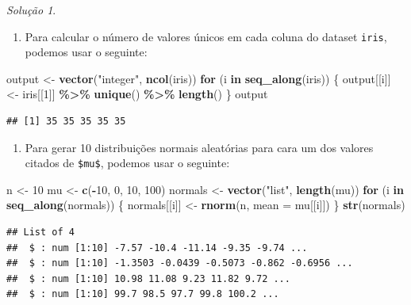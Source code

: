 \documentclass[
]{latex/krantz}
\newenvironment{Shaded}{\begin{snugshade}}{\end{snugshade}}
\newcommand{\AttributeTok}[1]{\textcolor[rgb]{0.13,0.29,0.53}{#1}}
\newcommand{\ControlFlowTok}[1]{\textcolor[rgb]{0.13,0.29,0.53}{\textbf{#1}}}
\newcommand{\DecValTok}[1]{\textcolor[rgb]{0.00,0.00,0.81}{#1}}
\newcommand{\FunctionTok}[1]{\textcolor[rgb]{0.13,0.29,0.53}{\textbf{#1}}}
\newcommand{\NormalTok}[1]{#1}
\newcommand{\OtherTok}[1]{\textcolor[rgb]{0.56,0.35,0.01}{#1}}
\newcommand{\SpecialCharTok}[1]{\textcolor[rgb]{0.81,0.36,0.00}{\textbf{#1}}}
\newcommand{\StringTok}[1]{\textcolor[rgb]{0.31,0.60,0.02}{#1}}
\providecommand{\tightlist}{%
  \setlength{\itemsep}{0pt}\setlength{\parskip}{0pt}}
\theoremstyle{definition}
\theoremstyle{definition}
\theoremstyle{definition}
\theoremstyle{definition}
\theoremstyle{remark}
\newtheorem*{solution}{Solução}
\begin{document}
\begin{solution}
\begin{enumerate}
\def\labelenumi{\alph{enumi}.}
\setcounter{enumi}{2}
\tightlist
\item
  Para calcular o número de valores únicos em cada coluna do dataset \texttt{iris}, podemos usar o seguinte:
\end{enumerate}

\begin{Shaded}
\begin{Highlighting}[]
\NormalTok{output }\OtherTok{\textless{}{-}} \FunctionTok{vector}\NormalTok{(}\StringTok{"integer"}\NormalTok{, }\FunctionTok{ncol}\NormalTok{(iris))}
\ControlFlowTok{for}\NormalTok{ (i }\ControlFlowTok{in} \FunctionTok{seq\_along}\NormalTok{(iris)) \{}
\NormalTok{  output[[i]] }\OtherTok{\textless{}{-}}\NormalTok{ iris[[}\DecValTok{1}\NormalTok{]] }\SpecialCharTok{\%\textgreater{}\%} 
                    \FunctionTok{unique}\NormalTok{() }\SpecialCharTok{\%\textgreater{}\%} 
                    \FunctionTok{length}\NormalTok{()}
\NormalTok{\}}
\NormalTok{output}
\end{Highlighting}
\end{Shaded}

\begin{verbatim}
## [1] 35 35 35 35 35
\end{verbatim}

\begin{enumerate}
\def\labelenumi{\alph{enumi}.}
\setcounter{enumi}{3}
\tightlist
\item
  Para gerar 10 distribuições normais aleatórias para cara um dos valores citados de \texttt{\$mu\$}, podemos usar o seguinte:
\end{enumerate}

\begin{Shaded}
\begin{Highlighting}[]
\NormalTok{n }\OtherTok{\textless{}{-}} \DecValTok{10}
\NormalTok{mu }\OtherTok{\textless{}{-}} \FunctionTok{c}\NormalTok{(}\SpecialCharTok{{-}}\DecValTok{10}\NormalTok{, }\DecValTok{0}\NormalTok{, }\DecValTok{10}\NormalTok{, }\DecValTok{100}\NormalTok{)}
\NormalTok{normals }\OtherTok{\textless{}{-}} \FunctionTok{vector}\NormalTok{(}\StringTok{"list"}\NormalTok{, }\FunctionTok{length}\NormalTok{(mu))}
\ControlFlowTok{for}\NormalTok{ (i }\ControlFlowTok{in} \FunctionTok{seq\_along}\NormalTok{(normals)) \{}
\NormalTok{  normals[[i]] }\OtherTok{\textless{}{-}} \FunctionTok{rnorm}\NormalTok{(n, }\AttributeTok{mean =}\NormalTok{ mu[[i]])}
\NormalTok{\}}
\FunctionTok{str}\NormalTok{(normals)}
\end{Highlighting}
\end{Shaded}

\begin{verbatim}
## List of 4
##  $ : num [1:10] -7.57 -10.4 -11.14 -9.35 -9.74 ...
##  $ : num [1:10] -1.3503 -0.0439 -0.5073 -0.862 -0.6956 ...
##  $ : num [1:10] 10.98 11.08 9.23 11.82 9.72 ...
##  $ : num [1:10] 99.7 98.5 97.7 99.8 100.2 ...
\end{verbatim}

\end{solution}
\end{document}
